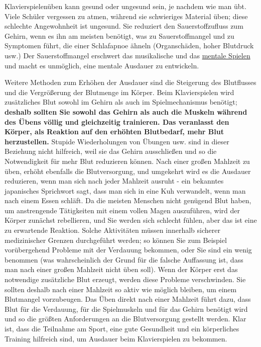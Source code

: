 Klavierspielenüben kann gesund oder ungesund sein, je nachdem wie man übt.
Viele Schüler vergessen zu atmen, während sie schwieriges Material üben; diese schlechte Angewohnheit ist ungesund.
Sie reduziert den Sauerstoffzufluss zum Gehirn, wenn es ihn am meisten benötigt, was zu Sauerstoffmangel und zu Symptomen führt, die einer Schlafapnoe ähneln (Organschäden, hoher Blutdruck usw.)
Der Sauerstoffmangel erschwert das musikalische und das \hyperlink{c1ii12mental}{mentale Spielen} und macht es unmöglich, eine mentale Ausdauer zu entwickeln.

Weitere Methoden zum Erhöhen der Ausdauer sind die Steigerung des Blutflusses und die Vergrößerung der Blutmenge im Körper.
Beim Klavierspielen wird zusätzliches Blut sowohl im Gehirn als auch im Spielmechanismus benötigt; \textbf{deshalb sollten Sie sowohl das Gehirn als auch die Muskeln während des Übens völlig und gleichzeitig trainieren.
Das veranlasst den Körper, als Reaktion auf den erhöhten Blutbedarf, mehr Blut herzustellen.}
Stupide Wiederholungen von Übungen usw. sind in dieser Beziehung nicht hilfreich, weil sie das Gehirn ausschließen und so die Notwendigkeit für mehr Blut reduzieren können.
Nach einer großen Mahlzeit zu üben, erhöht ebenfalls die Blutversorgung, und umgekehrt wird es die Ausdauer reduzieren, wenn man sich nach jeder Mahlzeit ausruht - ein bekanntes japanisches Sprichwort sagt, dass man sich in eine Kuh verwandelt, wenn man nach einem Essen schläft.
Da die meisten Menschen nicht genügend Blut haben, um anstrengende Tätigkeiten mit einem vollen Magen auszuführen, wird der Körper zunächst rebellieren, und Sie werden sich schlecht fühlen, aber das ist eine zu erwartende Reaktion.
Solche Aktivitäten müssen innerhalb sicherer medizinischer Grenzen durchgeführt werden; so können Sie zum Beispiel vorübergehend Probleme mit der Verdauung bekommen, oder Sie sind ein wenig benommen (was wahrscheinlich der Grund für die falsche Auffassung ist, dass man nach einer großen Mahlzeit nicht üben soll).
Wenn der Körper erst das notwendige zusätzliche Blut erzeugt, werden diese Probleme verschwinden.
Sie sollten deshalb nach einer Mahlzeit so aktiv wie möglich bleiben, um einem Blutmangel vorzubeugen.
Das Üben direkt nach einer Mahlzeit führt dazu, dass Blut für die Verdauung, für die Spielmuskeln und für das Gehirn benötigt wird und so die größten Anforderungen an die Blutversorgung gestellt werden.
Klar ist, dass die Teilnahme am Sport, eine gute Gesundheit und ein körperliches Training hilfreich sind, um Ausdauer beim Klavierspielen zu bekommen.

